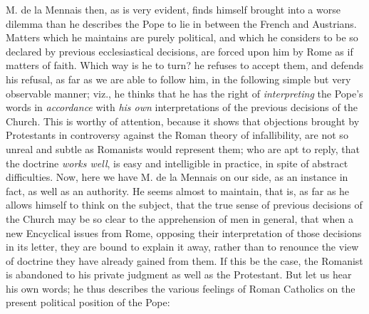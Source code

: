 M. de la Mennais then, as is very evident, finds
himself brought into a worse dilemma than he describes the Pope to lie
in between the French and Austrians. Matters which he maintains are
purely political, and which he considers to be so declared by previous
ecclesiastical decisions, are forced upon him by Rome as if matters of
faith. Which way is he to turn? he refuses to accept them, and defends
his refusal, as far as we are able to follow him, in the following
simple but very observable manner; viz., he thinks that he has the
right of \emph{interpreting} the Pope's words in \emph{accordance}
with \emph{his own} interpretations of the previous decisions of the
Church. This is worthy of attention, because it shows that objections
brought by Protestants in controversy against the Roman theory of
infallibility, are not so unreal and subtle as Romanists would
represent them; who are apt to reply, that the doctrine \emph{works well},
is easy and intelligible in practice, in spite of abstract
difficulties. Now, here we have M. de la Mennais on our side, as an
instance in fact, as well as an authority. He seems almost to
maintain, that is, as far as he allows himself to think on the
subject, that the true sense of previous decisions of the Church may
be so clear to the apprehension of men in general, that when a new
Encyclical issues from Rome, opposing their interpretation of
those decisions in its letter, they are bound to explain it away,
rather than to renounce the view of doctrine they have already gained
from them. If this be the case, the Romanist is abandoned to his
private judgment as well as the Protestant. But let us hear his own
words; he thus describes the various feelings of Roman Catholics on
the present political position of the Pope:

